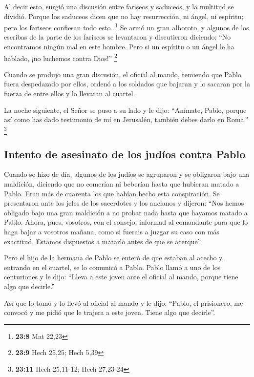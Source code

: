  Al decir esto, surgió una discusión entre fariseos y
saduceos, y la multitud se dividió.  Porque los saduceos
dicen que no hay resurrección, ni ángel, ni espíritu; pero los fariseos
confiesan todo esto. \footnote{\textbf{23:8} Mat 22,23} 
Se armó un gran alboroto, y algunos de los escribas de la parte de los
fariseos se levantaron y discutieron diciendo: ``No encontramos ningún
mal en este hombre. Pero si un espíritu o un ángel le ha hablado, ¡no
luchemos contra Dios!'' \footnote{\textbf{23:9} Hech 25,25; Hech 5,39}

 Cuando se produjo una gran discusión, el oficial al
mando, temiendo que Pablo fuera despedazado por ellos, ordenó a los
soldados que bajaran y lo sacaran por la fuerza de entre ellos y lo
llevaran al cuartel.

 La noche siguiente, el Señor se puso a su lado y le
dijo: ``Anímate, Pablo, porque así como has dado testimonio de mí en
Jerusalén, también debes darlo en Roma.'' \footnote{\textbf{23:11} Hech
  25,11-12; Hech 27,23-24}

\hypertarget{intento-de-asesinato-de-los-juduxedos-contra-pablo}{%
\subsection{Intento de asesinato de los judíos contra
Pablo}\label{intento-de-asesinato-de-los-juduxedos-contra-pablo}}

 Cuando se hizo de día, algunos de los judíos se
agruparon y se obligaron bajo una maldición, diciendo que no comerían ni
beberían hasta que hubieran matado a Pablo.  Eran más de
cuarenta los que habían hecho esta conspiración.  Se
presentaron ante los jefes de los sacerdotes y los ancianos y dijeron:
``Nos hemos obligado bajo una gran maldición a no probar nada hasta que
hayamos matado a Pablo.  Ahora, pues, vosotros, con el
consejo, informad al comandante para que lo haga bajar a vosotros
mañana, como si fuerais a juzgar su caso con más exactitud. Estamos
dispuestos a matarlo antes de que se acerque''.

 Pero el hijo de la hermana de Pablo se enteró de que
estaban al acecho y, entrando en el cuartel, se lo comunicó a Pablo.
 Pablo llamó a uno de los centuriones y le dijo: ``Lleva
a este joven ante el oficial al mando, porque tiene algo que decirle.''

 Así que lo tomó y lo llevó al oficial al mando y le
dijo: ``Pablo, el prisionero, me convocó y me pidió que le trajera a
este joven. Tiene algo que decirle''.

